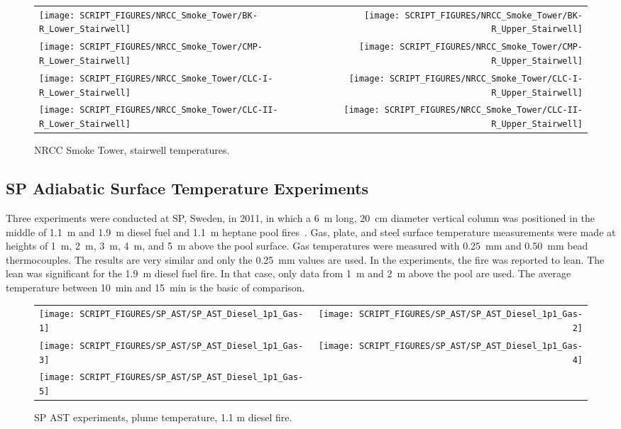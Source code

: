 \begin{figure}[p]
\begin{tabular*}{\textwidth}{l@{\extracolsep{\fill}}r}
\texttt{[image: SCRIPT\_FIGURES/NRCC\_Smoke\_Tower/BK-R\_Lower\_Stairwell]} &
\texttt{[image: SCRIPT\_FIGURES/NRCC\_Smoke\_Tower/BK-R\_Upper\_Stairwell]} \\
\texttt{[image: SCRIPT\_FIGURES/NRCC\_Smoke\_Tower/CMP-R\_Lower\_Stairwell]} &
\texttt{[image: SCRIPT\_FIGURES/NRCC\_Smoke\_Tower/CMP-R\_Upper\_Stairwell]} \\
\texttt{[image: SCRIPT\_FIGURES/NRCC\_Smoke\_Tower/CLC-I-R\_Lower\_Stairwell]} &
\texttt{[image: SCRIPT\_FIGURES/NRCC\_Smoke\_Tower/CLC-I-R\_Upper\_Stairwell]} \\
\texttt{[image: SCRIPT\_FIGURES/NRCC\_Smoke\_Tower/CLC-II-R\_Lower\_Stairwell]} &
\texttt{[image: SCRIPT\_FIGURES/NRCC\_Smoke\_Tower/CLC-II-R\_Upper\_Stairwell]}
\end{tabular*}
\caption[NRCC Smoke Tower, stairwell temperatures]{NRCC Smoke Tower, stairwell temperatures.}
\label{NRCC_Smoke_Tower_Stairwell}
\end{figure}



\clearpage


\subsection{SP Adiabatic Surface Temperature Experiments}

Three experiments were conducted at SP, Sweden, in 2011, in which a 6~m long, 20~cm diameter vertical column was positioned in the middle of 1.1~m and 1.9~m diesel fuel and 1.1~m heptane
pool fires~\cite{Sjostrom:AST}. Gas, plate, and steel surface temperature measurements were made at heights of 1~m, 2~m, 3~m, 4~m, and 5~m above the pool surface. Gas temperatures were measured with 0.25~mm and 0.50~mm bead thermocouples. The results are very similar and only the 0.25~mm values are used. In the experiments, the fire was reported to lean. The lean was significant for the 1.9~m diesel fuel fire. In that case, only data from 1~m and 2~m above the pool are used. The average temperature between 10~min and 15~min is the basic of comparison.


\begin{figure}[!h]
\begin{tabular*}{\textwidth}{l@{\extracolsep{\fill}}r}
\texttt{[image: SCRIPT\_FIGURES/SP\_AST/SP\_AST\_Diesel\_1p1\_Gas-1]}   &  \texttt{[image: SCRIPT\_FIGURES/SP\_AST/SP\_AST\_Diesel\_1p1\_Gas-2]}    \\
\texttt{[image: SCRIPT\_FIGURES/SP\_AST/SP\_AST\_Diesel\_1p1\_Gas-3]}   &  \texttt{[image: SCRIPT\_FIGURES/SP\_AST/SP\_AST\_Diesel\_1p1\_Gas-4]}     \\
\texttt{[image: SCRIPT\_FIGURES/SP\_AST/SP\_AST\_Diesel\_1p1\_Gas-5]}   &
\end{tabular*}
\caption[SP AST experiments, plume temperature, 1.1 m diesel fire]
{SP AST experiments, plume temperature, 1.1 m diesel fire.}
\label{SP_Diesel_1p1_Gas}
\end{figure}

